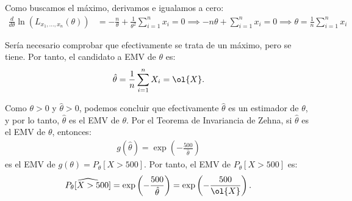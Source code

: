 \begin{ejemplo}
    Como buscamos el máximo, derivamos e igualamos a cero:
    \begin{align*}
        \frac{d}{d\theta} \ln(L_{x_1, \ldots, x_n}(\theta)) &= -\frac{n}{\theta} + \frac{1}{\theta^2} \sum_{i=1}^{n} x_i = 0 \implies -n\theta + \sum_{i=1}^{n} x_i = 0 \implies \theta = \frac{1}{n} \sum_{i=1}^{n} x_i
    \end{align*}

    Sería necesario comprobar que efectivamente se trata de un máximo, pero se tiene. Por tanto, el candidato a EMV de $\theta$ es:
    \begin{align*}
        \hat{\theta} = \frac{1}{n} \sum_{i=1}^{n} X_i = \ol{X}.
    \end{align*}

    Como $\theta > 0$ y $\hat{\theta} > 0$, podemos concluir que efectivamente $\hat{\theta}$ es un estimador de $\theta$, y por lo tanto, $\hat{\theta}$ es el EMV de $\theta$. Por el Teorema de Invariancia de Zehna, si $\hat{\theta}$ es el EMV de $\theta$, entonces:
    \begin{align*}
        g(\hat{\theta}) = \exp\left(-\frac{500}{\hat{\theta}}\right)
    \end{align*}
    es el EMV de $g(\theta) = P_{\theta}[X > 500]$. Por tanto, el EMV de $P_{\theta}[X > 500]$ es:
    \begin{align*}
        \widehat{P_{\theta}[X > 500]} = \exp\left(-\frac{500}{\hat{\theta}}\right) = \exp\left(-\frac{500}{\ol{X}}\right).
    \end{align*}
\end{ejemplo}

